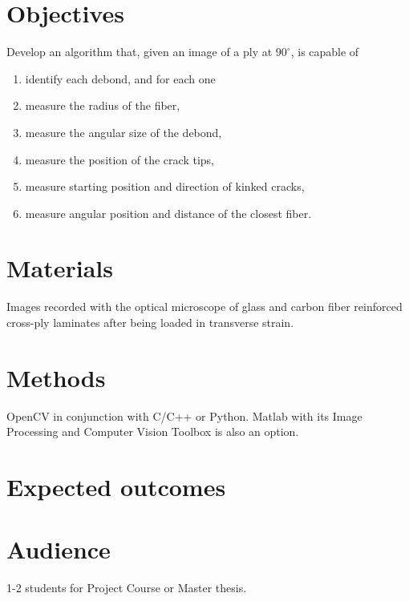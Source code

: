 \documentclass[review]{elsarticle}
\begin{document}
\section{Objectives}

Develop an algorithm that, given an image of a ply at $90^{\circ}$, is capable of

\begin{enumerate}
\item identify each debond, and for each one
\item measure the radius of the fiber,
\item measure the angular size of the debond,
\item measure the position of the crack tips,
\item measure starting position and direction of kinked cracks,
\item measure angular position and distance of the closest fiber.
\end{enumerate}

\section{Materials}

Images recorded with the optical microscope of glass and carbon fiber reinforced cross-ply laminates after being loaded in transverse strain.

\section{Methods}

OpenCV in conjunction with C/C++ or Python. Matlab with its Image Processing and Computer Vision Toolbox is also an option.

\section{Expected outcomes}

\section{Audience}

1-2 students for Project Course or Master thesis.
\end{document}
